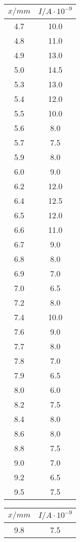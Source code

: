 \begin{table}
\begin{minipage}{0.25\textwidth}
	\begin{tabular}{c|c}
		\toprule
		{$x / mm$} & {$I / A\cdot10^{-9}$} \\
		\hline
        \midrule
        4.7 &10.0\\
        4.8 &11.0\\
        4.9 &13.0\\
        5.0 &14.5\\
        5.3 &13.0\\
        5.4 &12.0\\
        5.5 &10.0\\
        5.6 &8.0\\
        5.7 &7.5\\
        5.9 &8.0\\
        6.0 &9.0\\
        6.2 &12.0\\
        6.4 &12.5\\
        6.5 &12.0\\
        6.6 &11.0\\
        6.7 &9.0\\
        6.8 &8.0\\
        6.9 &7.0\\
        7.0 &6.5\\
        7.2 &8.0\\
        7.4 &10.0\\
        7.6 &9.0\\
        7.7 &8.0\\
        7.8 &7.0\\
        7.9 &6.5\\
        8.0 &6.0\\
        8.2 &7.5\\
        8.4 &8.0\\
        8.6 &8.0\\
        8.8 &7.5\\
        9.0 &7.0\\
        9.2 &6.5\\
        9.5 &7.5\\
		\bottomrule 
	\end{tabular}
\end{minipage}
\begin{minipage}{0.25\textwidth}
    \centering
	\label{tab:b}
	\begin{tabular}{c|c}
		\toprule
		{$x / mm$} & {$I / A\cdot10^{-9}$} \\
		\hline
        \midrule
        9.8 &7.5\\

\end{tabular}
\end{minipage}
\end{table}
